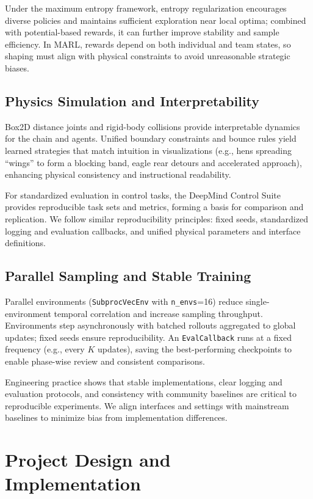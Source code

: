\documentclass[12pt]{article}
\begin{document}
Under the maximum entropy framework, entropy regularization encourages diverse policies and maintains sufficient exploration near local optima; combined with potential-based rewards, it can further improve stability and sample efficiency\cite{haarnoja2018sac}. In MARL, rewards depend on both individual and team states, so shaping must align with physical constraints to avoid unreasonable strategic biases\cite{nguyen2020deep}.

\subsection{Physics Simulation and Interpretability}
Box2D distance joints and rigid-body collisions provide interpretable dynamics for the chain and agents. Unified boundary constraints and bounce rules yield learned strategies that match intuition in visualizations (e.g., hens spreading “wings” to form a blocking band, eagle rear detours and accelerated approach), enhancing physical consistency and instructional readability.

For standardized evaluation in control tasks, the DeepMind Control Suite provides reproducible task sets and metrics, forming a basis for comparison and replication\cite{tassa2018deepmind}. We follow similar reproducibility principles: fixed seeds, standardized logging and evaluation callbacks, and unified physical parameters and interface definitions\cite{raffin2022stable}.

\subsection{Parallel Sampling and Stable Training}
Parallel environments (\texttt{SubprocVecEnv} with \texttt{n\_envs}=16) reduce single-environment temporal correlation and increase sampling throughput. Environments step asynchronously with batched rollouts aggregated to global updates; fixed seeds ensure reproducibility. An \texttt{EvalCallback} runs at a fixed frequency (e.g., every \(K\) updates), saving the best-performing checkpoints to enable phase-wise review and consistent comparisons.

Engineering practice shows that stable implementations, clear logging and evaluation protocols, and consistency with community baselines are critical to reproducible experiments\cite{raffin2022stable}. We align interfaces and settings with mainstream baselines to minimize bias from implementation differences.


\section{Project Design and Implementation}
\end{document}
